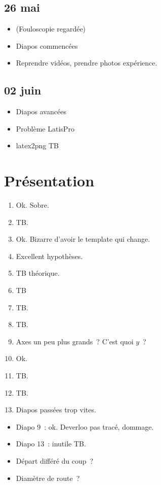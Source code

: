 \documentclass[a4paper, 11pt, final, garamond]{book}
\begin{document}
\subsection{26 mai}
\begin{itemize}
  \item (Fouloscopie regardée)
  \item Diapos commencées
  \item Reprendre vidéos, prendre photos expérience.
\end{itemize}

\subsection{02 juin}
\begin{itemize}
  \item Diapos avancées
  \item Problème LatisPro
  \item latex2png TB
\end{itemize}

\section{Présentation}

\begin{enumerate}
  \item Ok. Sobre.
  \item TB.
  \item Ok. Bizarre d'avoir le template qui change.
  \item Excellent hypothèses.
  \item TB théorique.
  \item TB
  \item TB.
  \item TB.
  \item Axes un peu plus grands~? C'est quoi $y$~?
  \item Ok.
  \item TB.
  \item TB.
  \item Diapos passées trop vites.
\end{enumerate}

\begin{itemize}
  \item Diapo 9~: ok. Deverloo pas tracé, dommage.
  \item Diapo 13~: inutile TB.
  \item Départ différé du coup~?
  \item Diamètre de route~?
\end{itemize}
\end{document}
